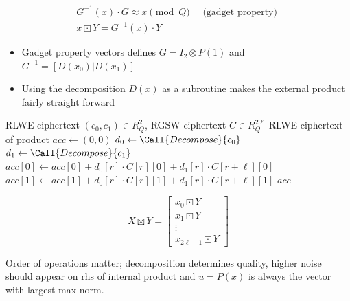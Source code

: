 \begin{definition}
    \cite{cryptoeprint:2018/421}
    \begin{gather}
        G^{-1}(x)\cdot G \approx x \pmod{Q} \quad\text{ (gadget property) } \\
        x\boxdot Y = G^{-1}(x)\cdot Y
    \end{gather}
\end{definition}

\begin{itemize}
    \item Gadget property vectors defines $G = I_2 \otimes P(1)$ and $G^{-1} = [D(x_0)|D(x_1)]$
    \item Using the decomposition $D(x)$ as a subroutine makes the external product fairly straight forward
\end{itemize}

\begin{algorithm}
\caption{External Product $\rlwe \boxdot \rgsw$ (RNS)}
\label{alg:external-product}
\begin{algorithmic}[1]
\Require RLWE ciphertext $(c_0, c_1) \in R_Q^2$, RGSW ciphertext $C \in R_Q^{2\ell}$
\Ensure RLWE ciphertext of product
\State $acc \gets (0, 0)$
\State $d_0 \gets \Call{Decompose}{c_0}$
\State $d_1 \gets \Call{Decompose}{c_1}$
\For{$r \gets [0, \ell)$}
    \State $acc[0] \gets acc[0] + d_0[r] \cdot C[r][0] + d_1[r]\cdot C[r+\ell][0]$
    \State $acc[1] \gets acc[1] + d_0[r] \cdot C[r][1] + d_1[r]\cdot C[r+\ell][1]$
\EndFor
\State \Return $acc$
\end{algorithmic}
\end{algorithm}

\begin{definition}
    \cite{cryptoeprint:2018/421}
    \begin{equation}
        \label{def:prod:internal}
        X\boxtimes Y = 
        \begin{bmatrix}
            x_0 \boxdot Y \\
            x_1 \boxdot Y \\
            \vdots \\
            x_{2\ell -1} \boxdot Y
        \end{bmatrix}
    \end{equation}
\end{definition}

\begin{remark}
    Order of operations matter; decomposition determines quality, higher noise should appear on rhs of internal product and $u=P(x)$ is always the vector with largest max norm.
\end{remark}

